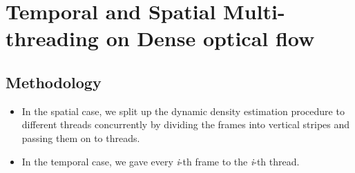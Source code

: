 \documentclass[a4paper]{article}
\begin{document}
\section*{Temporal and Spatial Multi-threading on Dense optical flow}
\subsection*{Methodology}
\begin{itemize}
    \item In the spatial case, we split up the dynamic density estimation procedure to different threads concurrently by dividing the frames into vertical stripes and passing them on to threads.
    \item In the temporal case, we gave every \textit{i}-th frame to the \textit{i}-th thread. 
    
\end{itemize}
\end{document}
